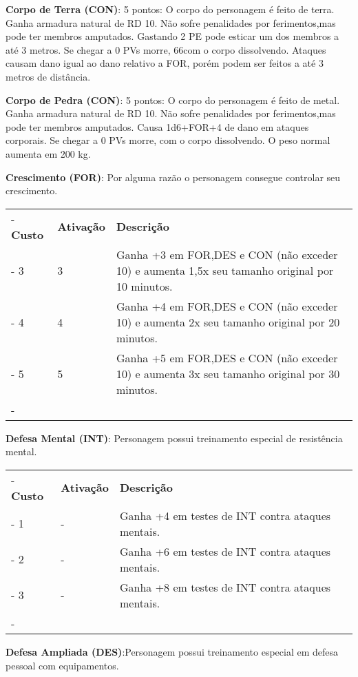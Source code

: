 \begin{small}
\textbf{Corpo de Terra (CON)}:
5 pontos: O corpo do personagem é feito de terra. Ganha armadura natural de
RD 10. Não sofre penalidades por ferimentos,mas pode ter membros amputados.
Gastando 2 PE pode esticar um dos membros a até 3 metros. Se chegar a 0 PVs morre,
66com o corpo dissolvendo. Ataques causam dano igual ao dano relativo a FOR, porém
podem ser feitos a até 3 metros de distância.

\textbf{Corpo de Pedra (CON)}:
5 pontos: O corpo do personagem é feito de metal. Ganha armadura natural de
RD 10. Não sofre penalidades por ferimentos,mas pode ter membros amputados. Causa
1d6+FOR+4 de dano em ataques corporais. Se chegar a 0 PVs morre, com o corpo
dissolvendo. O peso normal aumenta em 200 kg.



\textbf{Crescimento (FOR)}: Por alguma razão o personagem consegue controlar seu crescimento.

	\begin{tabu}{|X[c]|X[c]|X[3]|} \tabucline-
		\textbf{Custo} 	& \textbf{Ativação}	&	\textbf{Descrição} \\ \tabucline-
		3	& 	3			& Ganha +3 em FOR,DES e CON (não exceder 10) e aumenta 1,5x seu tamanho original por 10 minutos. \\ \tabucline-
		4	& 	4			& Ganha +4 em FOR,DES e CON (não exceder 10) e aumenta 2x seu tamanho original por 20 minutos. \\ \tabucline-
		5	& 	5			& Ganha +5 em FOR,DES e CON (não exceder 10) e aumenta 3x seu tamanho original por 30 minutos. \\ \tabucline-
		\end{tabu}


\textbf{Defesa Mental (INT)}: Personagem possui treinamento especial de resistência mental.

	\begin{tabu}{|X[c]|X[c]|X[3]|} \tabucline-
		\textbf{Custo} 	& \textbf{Ativação}	&	\textbf{Descrição} \\ \tabucline-
		1	& 	-		& Ganha +4 em testes de INT contra ataques mentais. \\ \tabucline-
		2	& 	-		& Ganha +6 em testes de INT contra ataques mentais. \\ \tabucline-
		3	& 	-		& Ganha +8 em testes de INT contra ataques mentais. \\ \tabucline-
	\end{tabu}


\textbf{Defesa Ampliada (DES)}:Personagem possui treinamento especial em defesa pessoal com equipamentos.


\end{small}
